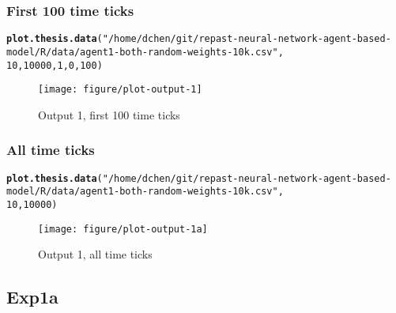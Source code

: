 \documentclass{article}\usepackage[]{graphicx}\usepackage[]{color}
\makeatletter
\def\maxwidth{ %
  \ifdim\Gin@nat@width>\linewidth
    \linewidth
  \else
    \Gin@nat@width
  \fi
}
\newcommand{\hlnum}[1]{\textcolor[rgb]{0.686,0.059,0.569}{#1}}%
\newcommand{\hlstr}[1]{\textcolor[rgb]{0.192,0.494,0.8}{#1}}%
\newcommand{\hlstd}[1]{\textcolor[rgb]{0.345,0.345,0.345}{#1}}%
\newcommand{\hlkwd}[1]{\textcolor[rgb]{0.737,0.353,0.396}{\textbf{#1}}}%
\newenvironment{kframe}{%
 \def\at@end@of@kframe{}%
 \ifinner\ifhmode%
  \def\at@end@of@kframe{\end{minipage}}%
  \begin{minipage}{\columnwidth}%
 \fi\fi%
 \def\FrameCommand##1{\hskip\@totalleftmargin \hskip-\fboxsep
 \colorbox{shadecolor}{##1}\hskip-\fboxsep
     \hskip-\linewidth \hskip-\@totalleftmargin \hskip\columnwidth}%
 \MakeFramed {\advance\hsize-\width
   \@totalleftmargin\z@ \linewidth\hsize
   \@setminipage}}%
 {\par\unskip\endMakeFramed%
 \at@end@of@kframe}
\newenvironment{knitrout}{}{} %
\makeatother
\begin{document}
\subsubsection{First 100 time ticks}
\begin{knitrout}
\color{fgcolor}\begin{kframe}
\begin{alltt}
\hlkwd{plot.thesis.data}\hlstd{(}\hlstr{"/home/dchen/git/repast-neural-network-agent-based-model/R/data/agent1-both-random-weights-10k.csv"}\hlstd{,}
    \hlnum{10}\hlstd{,} \hlnum{10000}\hlstd{,} \hlnum{1}\hlstd{,} \hlnum{0}\hlstd{,} \hlnum{100}\hlstd{)}
\end{alltt}
\end{kframe}\begin{figure}[]

\texttt{[image: figure/plot-output-1]} \caption[Output 1, first 100 time ticks]{Output 1, first 100 time ticks\label{fig:plot-output-1}}
\end{figure}


\end{knitrout}


\newpage
\subsubsection{All time ticks}
\begin{knitrout}
\color{fgcolor}\begin{kframe}
\begin{alltt}
\hlkwd{plot.thesis.data}\hlstd{(}\hlstr{"/home/dchen/git/repast-neural-network-agent-based-model/R/data/agent1-both-random-weights-10k.csv"}\hlstd{,}
    \hlnum{10}\hlstd{,} \hlnum{10000}\hlstd{)}
\end{alltt}
\end{kframe}\begin{figure}[]

\texttt{[image: figure/plot-output-1a]} \caption[Output 1, all time ticks]{Output 1, all time ticks\label{fig:plot-output-1a}}
\end{figure}


\end{knitrout}


\newpage
\subsection{Exp1a}
\end{document}
